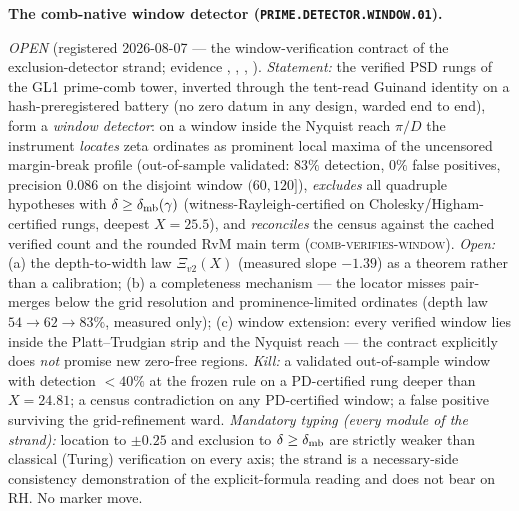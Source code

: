 \documentclass[11pt,a4paper]{article}
\begin{document}
\par\smallskip\noindent\textbf{The comb-native window detector
(\texttt{PRIME.DETECTOR.WINDOW.01}).}
{\sloppy
\emph{OPEN} (registered 2026-08-07 --- the window-verification
contract of the exclusion-detector strand; evidence
,
,
,
).  \emph{Statement:} the
verified PSD rungs of the GL1 prime-comb tower, inverted through
the tent-read Guinand identity on a hash-preregistered battery
(no zero datum in any design, warded end to end), form a
\emph{window detector}: on a window inside the Nyquist reach
$\pi/D$ the instrument \emph{locates} zeta ordinates as
prominent local maxima of the uncensored margin-break profile
(out-of-sample validated: $83\%$ detection, $0\%$ false
positives, precision $0.086$ on the disjoint window $(60, 120]$),
\emph{excludes} all quadruple hypotheses with $\delta \ge
\delta_{\rm mb}(\gamma)$ (witness-Rayleigh-certified on
Cholesky/Higham-certified rungs, deepest $X = 25.5$), and
\emph{reconciles} the census against the cached verified count
and the rounded RvM main term
(\textsc{comb-verifies-window}).  \emph{Open:} (a) the
depth-to-width law $\Xi_{v2}(X)$ (measured slope $-1.39$) as a
theorem rather than a calibration; (b) a completeness mechanism
--- the locator misses pair-merges below the grid resolution and
prominence-limited ordinates (depth law $54 \to 62 \to 83\%$,
measured only); (c) window extension: every verified window lies
inside the Platt--Trudgian strip and the Nyquist reach --- the
contract explicitly does \emph{not} promise new zero-free
regions.  \emph{Kill:} a validated out-of-sample window with
detection $< 40\%$ at the frozen rule on a PD-certified rung
deeper than $X = 24.81$; a census contradiction on any
PD-certified window; a false positive surviving the
grid-refinement ward.  \emph{Mandatory typing (every module of
the strand):} location to $\pm 0.25$ and exclusion to $\delta \ge
\delta_{\rm mb}$ are strictly weaker than classical (Turing)
verification on every axis; the strand is a necessary-side
consistency demonstration of the explicit-formula reading and
does not bear on RH.  No marker move.\par}
\end{document}

